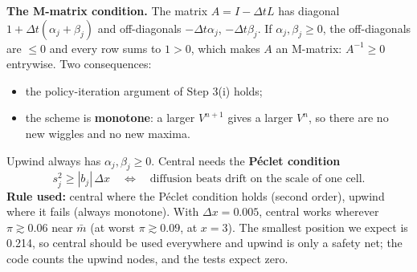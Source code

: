 \documentclass[11pt]{article}
\newcommand{\mb}{\bar m}
\begin{document}
\textbf{The M-matrix condition.} The matrix $A=I-\Delta tL$ has diagonal
$1+\Delta t(\alpha_j+\beta_j)$ and off-diagonals $-\Delta t\alpha_j$, $-\Delta t\beta_j$.
If $\alpha_j,\beta_j\ge0$, the off-diagonals are $\le0$ and every row sums to $1>0$, which
makes $A$ an M-matrix: $A^{-1}\ge0$ entrywise. Two consequences:
\begin{itemize}
  \item the policy-iteration argument of Step 3(i) holds;
  \item the scheme is \textbf{monotone}: a larger $V^{n+1}$ gives a larger $V^n$, so there
        are no new wiggles and no new maxima.
\end{itemize}
Upwind always has $\alpha_j,\beta_j\ge0$. Central needs the \textbf{P\'eclet condition}
\[
  s_j^2 \ge |b_j|\,\Delta x \quad\Longleftrightarrow\quad \text{diffusion beats drift on the
  scale of one cell.}
\]
\textbf{Rule used:} central where the P\'eclet condition holds (second order), upwind where
it fails (always monotone). With $\Delta x=0.005$, central works wherever $\pi\gtrsim0.06$
near $\mb$ (at worst $\pi\gtrsim0.09$, at $x=3$). The smallest position we expect is 0.214,
so central should be used everywhere and upwind is only a safety net; the code counts the
upwind nodes, and the tests expect zero.
\end{document}
